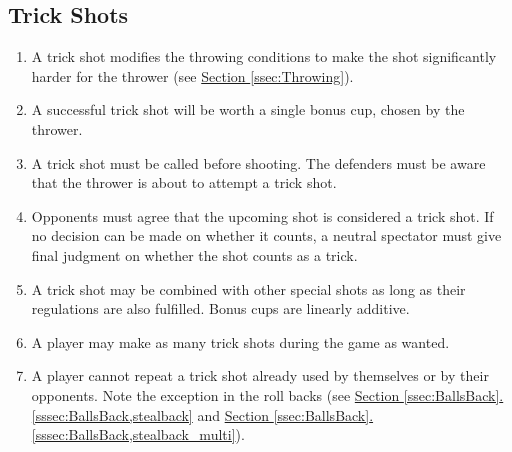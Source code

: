 	\subsection{Trick Shots}\label{ssec:TrickShots}
        \begin{enumerate}[label=(\roman*), ref=\roman*]
            \item \label{sssec:trickShots,deff} A trick shot modifies the throwing conditions to make the shot significantly harder for the thrower
                (see \hyperref[ssec:Throwing]{Section \ref*{ssec:Throwing}}).
            \item \label{sssec:TrickShots,numofcups} A successful trick shot will be worth a single bonus cup, chosen by the thrower.
            \item \label{sssec:TrickShots,calling} A trick shot must be called before shooting.
                The defenders must be aware that the thrower is about to attempt a trick shot.
            \item \label{sssec:TrickShot,agree} Opponents must agree that the upcoming shot is considered a trick shot.
                If no decision can be made on whether it counts, a neutral spectator must give final judgment on whether the shot counts as a trick.
            \item \label{sssec:TrickShot,combo} A trick shot may be combined with other special shots as long as their regulations are also fulfilled.
                Bonus cups are linearly additive. 
            \item \label{sssec:TrickShot,number} A player may make as many trick shots during the game as wanted.
            \item \label{sssec:TrickShot,repeat} A player cannot repeat a trick shot already used by themselves or by their opponents.
                Note the exception in the roll backs (see \hyperref[sssec:BallsBack,stealback]{Section \ref*{ssec:BallsBack}.\ref*{sssec:BallsBack,stealback}} and \hyperref[sssec:BallsBack,stealback_multi]{Section \ref*{ssec:BallsBack}.\ref*{sssec:BallsBack,stealback_multi}}).
        \end{enumerate}
